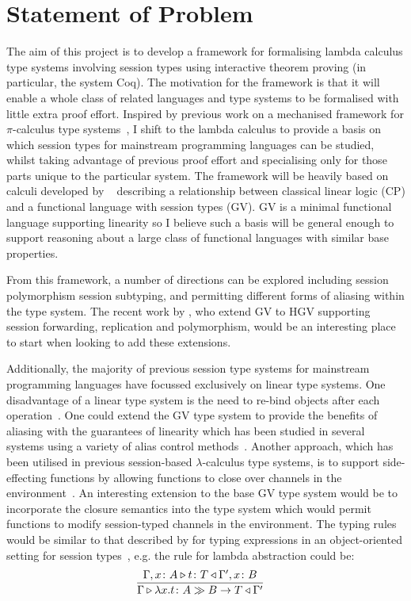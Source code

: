 \documentclass{mprop}
\newcommand{\typestate}[2]{{#1}\gg{#2}}
\begin{document}
\section{Statement of Problem}

The aim of this project is to develop a framework for formalising lambda
calculus type systems involving session types using interactive theorem
proving (in particular, the system Coq). The motivation for the framework is
that it will enable a whole class of related languages and type systems to be
formalised with little extra proof effort. Inspired by previous work on a
mechanised framework for $\pi$-calculus type systems~\cite{Gay:2001:FFP}, I
shift to the lambda calculus to provide a basis on which session types for
mainstream programming languages can be studied, whilst taking advantage of
previous proof effort and specialising only for those parts unique to the
particular system. The framework will be heavily based on calculi developed by
\citeauthor{Wadler:2014}~\cite{Wadler:2014} describing a relationship between
classical linear logic (CP) and a functional language with session types
(GV). GV is a minimal functional language supporting linearity so I believe
such a basis will be general enough to support reasoning about a large class
of functional languages with similar base properties.

From this framework, a number of directions can be explored including session
polymorphism session subtyping, and permitting different forms of aliasing
within the type system. The recent work by \citeauthor{Lindley:2014:SAP}
\cite{Lindley:2014:SAP}, who extend GV to HGV supporting session forwarding,
replication and polymorphism, would be an interesting place to start when
looking to add these extensions.

Additionally, the majority of previous session type systems for mainstream
programming languages have focussed exclusively on linear type systems. One
disadvantage of a linear type system is the need to re-bind objects after each
operation~\cite{Gay:2010:LAST}. One could extend the GV type system to provide
the benefits of aliasing with the guarantees of linearity which has been
studied in several systems using a variety of alias control
methods~\cite{Fahndrich:2002,Mazurak:2010:LLT,Tov:2011}. Another approach,
which has been utilised in previous session-based $\lambda$-calculus type
systems, is to support side-effecting functions by allowing functions to close
over channels in the environment~\cite{Gay:2003:STI,Vasconcelos:2006:TCM}. An
interesting extension to the base GV type system would be to incorporate the
closure semantics into the type system which would permit functions to modify
session-typed channels in the environment. The typing rules would be similar
to that described by \citeauthor{Gay:2010:MST} for typing expressions in an
object-oriented setting for session types~\cite{Gay:2010:MST}, e.g. the rule
for lambda abstraction could be:
\begin{gather*}
  \frac{
    \typeds{\Gamma,\typedid{x}{A}}{t}{T}{\Gamma',\typedid{x}{B}}
  }{
    \typeds{\Gamma}{\abs{x}{t}}{\fn{\typestate{A}{B}}{T}}{\Gamma'}
  }\quad
\end{gather*}
\end{document}
